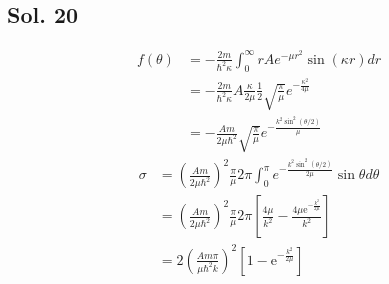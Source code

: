 \subsection*{Sol. 20}
\begin{align*}
    f(\theta )
     & =-\frac{2m}{\hbar^2\kappa}
    \int_0^\infty
    rAe^{-\mu r^2}\sin(\kappa r)dr \\
     & =
    -\frac{2m}{\hbar^2\kappa}A
    \frac{\kappa}{2\mu}\frac{1}{2}\sqrt{\frac{\pi}{\mu}}e^{-\frac{\kappa^2}{4\mu}} \\
     & =
    -\frac{Am}{2\mu\hbar^2}
    \sqrt{\frac{\pi}{\mu}}e^{-\frac{k^2\sin^2(\theta/2)}{\mu}}
\end{align*}
\begin{align*}
    \sigma & =\left(\frac{Am}{2\mu\hbar^2}\right)^2
    \frac{\pi}{\mu}2\pi\int_0^\pi
    e^{-\frac{k^2\sin^2(\theta/2)}{2\mu}}\sin\theta d\theta \\
           & =\left(\frac{Am}{2\mu\hbar^2}\right)^2
    \frac{\pi}{\mu}2\pi
    \left[\frac{4{\mu}}{k^{2}} - \frac{4{\mu}\mathrm{e}^{-\frac{k^{2}}{2{\mu}}}}{k^{2}}\right] \\
           & =2
    \left(\frac{Am\pi}{\mu\hbar^2k}\right)^2
    \left[1 - \mathrm{e}^{-\frac{k^{2}}{2{\mu}}}\right]
\end{align*}

